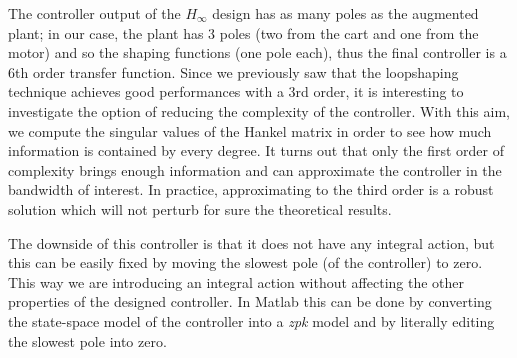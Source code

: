 The controller output of the $H_{\infty}$ design has as many poles as the augmented plant; in our case, the plant has 3 poles (two from the cart and one from the motor) and so the shaping functions (one pole each), thus the final controller is a 6th order transfer function. Since we previously saw that the loopshaping technique achieves good performances with a 3rd order, it is interesting to investigate the option of reducing the complexity of the controller. With this aim, we compute the singular values of the Hankel matrix in order to see how much information is contained by every degree. It turns out that only the first order of complexity brings enough information and can approximate the controller in the bandwidth of interest. In practice, approximating to the third order is a robust solution which will not perturb for sure the theoretical results.\\

  \begin{figure}[h]
  \centering
  \hfill
  \caption{}
\end{figure}

The downside of this controller is that it does not have any integral action, but this can be easily fixed by moving the slowest pole (of the controller) to zero. This way we are introducing an integral action without affecting the other properties of the designed controller. In Matlab this can be done by converting the state-space model of the controller into a \emph{zpk} model and by literally editing the slowest pole into zero.\\

